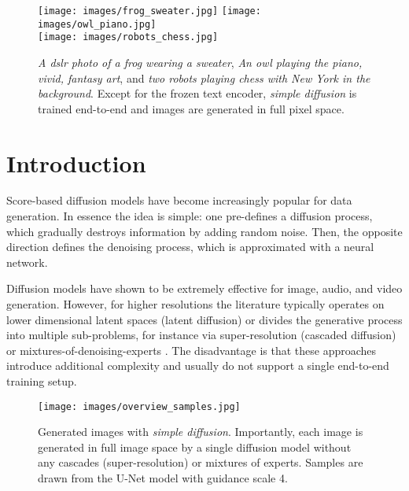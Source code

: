\begin{figure}
    \centering
    \texttt{[image: images/frog\_sweater.jpg]} \hspace{.01\textwidth}
    \texttt{[image: images/owl\_piano.jpg]} \\
    \vspace{.24cm}
    \texttt{[image: images/robots\_chess.jpg]}
    \caption{\textit{A dslr photo of a frog wearing a sweater}, \textit{An owl playing the piano, vivid, fantasy art}, and \textit{two robots playing chess with New York in the background}. Except for the frozen text encoder, \textit{simple diffusion} is trained end-to-end and images are generated in full pixel space.}
    \label{fig:frog_sweater}
    \vspace{-.4cm}
\end{figure}

\section{Introduction}
Score-based diffusion models have become increasingly popular for data generation. In essence the idea is simple: one pre-defines a diffusion process, which gradually destroys information by adding random noise. Then, the opposite direction defines the denoising process, which is approximated with a neural network.\vspace{.2cm}

Diffusion models have shown to be extremely effective for image, audio, and video generation. However, for higher resolutions the literature typically operates on lower dimensional latent spaces (latent diffusion) \citep{rombach2022highresolution} or divides the generative process into multiple sub-problems, for instance via super-resolution (cascaded diffusion) \citep{ho2022cascaded} or mixtures-of-denoising-experts \citep{balaji2022ediffi}. The disadvantage is that these approaches introduce additional complexity and usually do not support a single end-to-end training setup.

\begin{figure*}[]
    \centering
    \texttt{[image: images/overview\_samples.jpg]}\vspace{-.2cm}
    \caption{Generated images with \textit{simple diffusion}. Importantly, each image is generated in full image space by a single diffusion model without any cascades (super-resolution) or mixtures of experts. Samples are drawn from the U-Net model with guidance scale 4.}
    \label{fig:overview}
\end{figure*}

